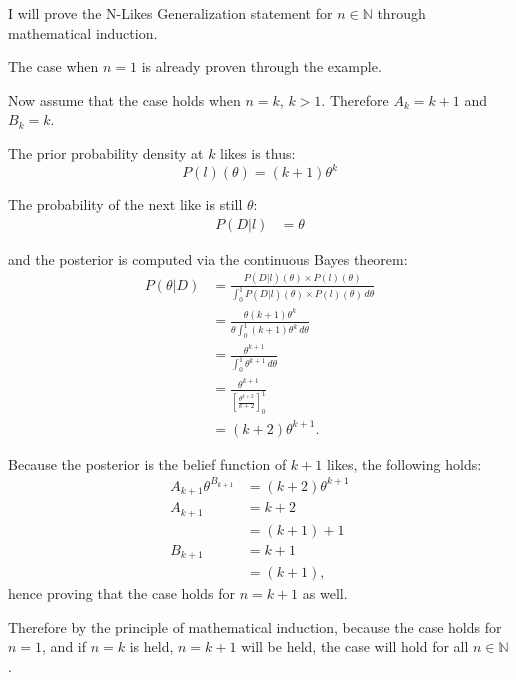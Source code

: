 \documentclass[a4paper,11pt]{article}
\newcommand*\Eval[3]{\left[#1\right]_{#3}^{#2}}
\newenvironment{Proof}[1][Proof]
{\proof[#1]\leftskip=1cm\rightskip=1cm}
{\endproof}
\begin{document}
\begin{Proof}
	I will prove the N-Likes Generalization statement for $n\in \mathbb{N}$ through mathematical induction.
	
	The case when $n=1$ is already proven through the example.
	
	Now assume that the case holds when $n=k$, $k > 1$. Therefore $A_k = k+1$ and $B_k = k$.
	
	The prior probability density at $k$ likes is thus:
	\[
	P(l)(\theta) = (k+1) \theta ^{k}
	\]
	
	The probability of the next like is still $\theta$:
	\begin{align*}
	P(D|l) &= \theta
	\end{align*}
	
	and the posterior is computed via the continuous Bayes theorem:
	\begin{align*}
	P(\theta|D) &= \frac{P(D|l)(\theta) \times P(l)(\theta)}{\int_{0}^{1} P(D|l)(\theta) \times P(l)(\theta) \, d\theta}\\
	&= \frac{\theta (k+1)\theta^k}{\theta \int_0^1 (k+1)\theta^k \, d\theta}\\
	&= \frac{\theta^{k+1}}{\int_0^1 \theta^{k+1} \, d\theta}\\
	&= \frac{\theta^{k+1}}{\Eval{\frac{\theta^{k+2}}{k+2}}{1}{0}}\\
	&= (k+2) \theta^{k+1}.
	\end{align*}
	
	Because the posterior is the belief function of $k+1$ likes, the following holds:
	\begin{align*}
	A_{k+1} \theta^{B_{k+1}} &= (k+2) \theta ^{k+1}\\
	A_{k+1} &= k+2\\
	&= (k+1) + 1\\
	B_{k+1} &= k+1\\
	&= (k+1),
	\end{align*}
	hence proving that the case holds for $n=k+1$ as well.
	
	Therefore by the principle of mathematical induction, because the case holds for $n=1$, and if $n=k$ is held, $n=k+1$ will be held, the case will hold for all $n\in\mathbb{N}$.
\end{Proof}




\end{document}
